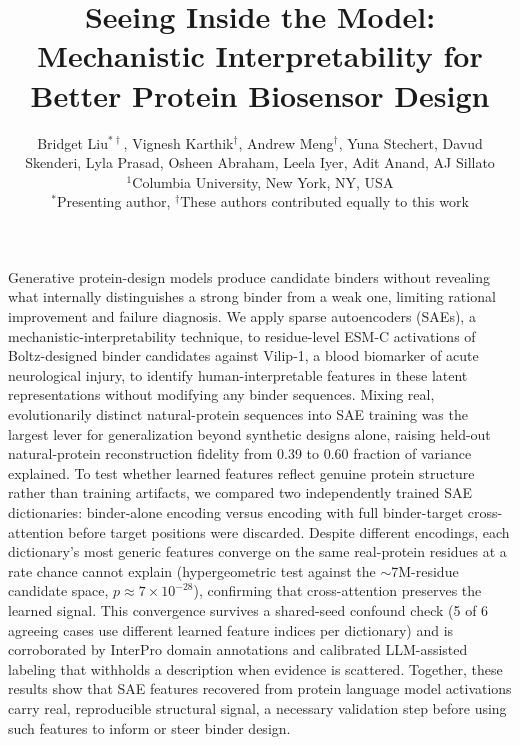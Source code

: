 \documentclass[11pt]{article}
\date{}
\title{Seeing Inside the Model: Mechanistic Interpretability for Better Protein Biosensor Design}
\author{
    Bridget Liu$^{\ast\dagger}$,
    Vignesh Karthik$^{\dagger}$,
    Andrew Meng$^{\dagger}$,
    Yuna Stechert,
    Davud Skenderi,
    Lyla Prasad,
    Osheen Abraham,
    Leela Iyer,
    Adit Anand,
    AJ Sillato \\[6pt]
    {\small $^{1}$Columbia University, New York, NY, USA} \\
    {\small $^{\ast}$Presenting author, $^{\dagger}$These authors contributed equally to this work}
}
\begin{document}
\maketitle

Generative protein-design models produce candidate binders without revealing what internally distinguishes a strong binder from a weak one, limiting rational improvement and failure diagnosis. We apply sparse autoencoders (SAEs), a mechanistic-interpretability technique, to residue-level ESM-C activations of Boltz-designed binder candidates against Vilip-1, a blood biomarker of acute neurological injury, to identify human-interpretable features in these latent representations without modifying any binder sequences. Mixing real, evolutionarily distinct natural-protein sequences into SAE training was the largest lever for generalization beyond synthetic designs alone, raising held-out natural-protein reconstruction fidelity from 0.39 to 0.60 fraction of variance explained. To test whether learned features reflect genuine protein structure rather than training artifacts, we compared two independently trained SAE dictionaries: binder-alone encoding versus encoding with full binder-target cross-attention before target positions were discarded. Despite different encodings, each dictionary's most generic features converge on the same real-protein residues at a rate chance cannot explain (hypergeometric test against the $\sim$7M-residue candidate space, $p \approx 7\times10^{-28}$), confirming that cross-attention preserves the learned signal. This convergence survives a shared-seed confound check (5 of 6 agreeing cases use different learned feature indices per dictionary) and is corroborated by InterPro domain annotations and calibrated LLM-assisted labeling that withholds a description when evidence is scattered. Together, these results show that SAE features recovered from protein language model activations carry real, reproducible structural signal, a necessary validation step before using such features to inform or steer binder design.


\end{document}
